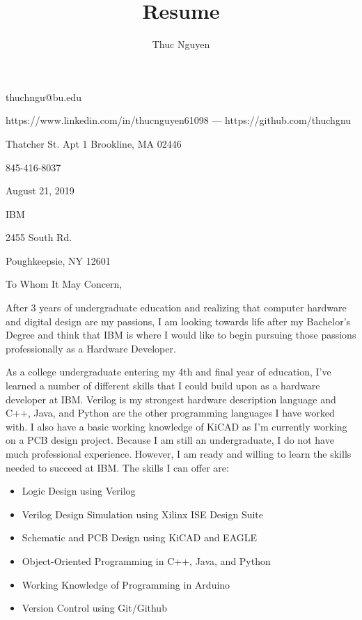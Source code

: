 \documentclass{article}
\makeatletter
\renewcommand{\maketitle}
{\begin{center}
{\huge\bfseries\theauthor}
\vspace{.5em}

thuchngu@bu.edu

https://www.linkedin.com/in/thucnguyen61098 --- https://github.com/thuchgnu

\end{center}}
\makeatother
\begin{document}
\title{Resume}
\author{Thuc Nguyen}
\maketitle
\vspace{-.5em}
{ Thatcher St. Apt 1 Brookline, MA 02446

845-416-8037

}

\begin{flushleft}
\vspace{2em}

August 21, 2019

\vspace{1.6em}
IBM

2455 South Rd.

Poughkeepsie, NY 12601

\end{flushleft}
\vspace{1.6em}
To Whom It May Concern,

\vspace{1em}
After 3 years of undergraduate education and realizing that computer hardware and digital design are my passions, I am looking towards life after my Bachelor's Degree and think that IBM is where I would like to begin pursuing those passions professionally as a Hardware Developer.

\vspace{.6em}
As a college undergraduate entering my 4th and final year of education, I've learned a number of different skills that I could build upon as a hardware developer at IBM. Verilog is my strongest hardware description language and C++, Java, and Python are the other programming languages I have worked with. I also have a basic working knowledge of KiCAD as I'm currently working on a PCB design project. Because I am still an undergraduate, I do not have much professional experience. However, I am ready and willing to learn the skills needed to succeed at IBM. The skills I can offer are:

\begin{itemize}
  \item{Logic Design using Verilog}
  \item{Verilog Design Simulation using Xilinx ISE Design Suite}
  \item{Schematic and PCB Design using KiCAD and EAGLE}
  \item{Object-Oriented Programming in C++, Java, and Python}
  \item{Working Knowledge of Programming in Arduino}
  \item{Version Control using Git/Github}
\end{itemize}
\end{document}
